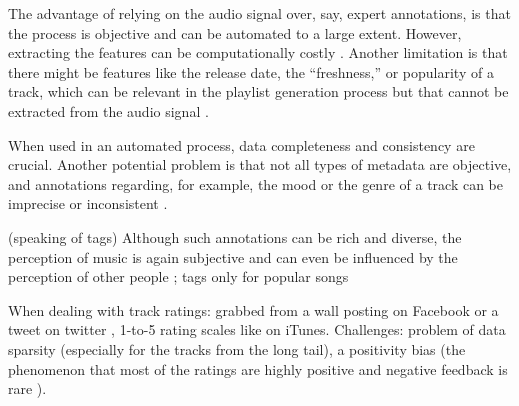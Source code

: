 The advantage of relying on the audio signal over, say, expert annotations, is that
the process is objective and can be automated to a large extent. However, extracting
the features can be computationally costly \cite{schma13}. Another
limitation is that there might be features like the release date, the “freshness,” or
popularity of a track, which can be relevant in the playlist generation process but that
cannot be extracted from the audio signal \cite{celma08}.

When used in an automated process, data completeness and consistency are crucial.
Another potential problem is that not all types of metadata are objective, and annotations regarding, for example, the mood or the genre of a track can be imprecise or inconsistent \cite{celma2010}.

(speaking of tags) Although such annotations can be rich and diverse, the perception of music is again subjective and can even be influenced by the perception of other people \cite{mcdermott12}; tags only for popular songs \cite{celma2010}

When dealing with track ratings: grabbed from a wall posting on Facebook \cite{germain13} or a tweet on twitter \cite{hauger13}, 1-to-5 rating scales like on iTunes. Challenges: problem of data sparsity (especially for the tracks from the long tail), a positivity bias (the phenomenon that most of the ratings are highly positive and negative feedback is rare \cite{celma2010}).